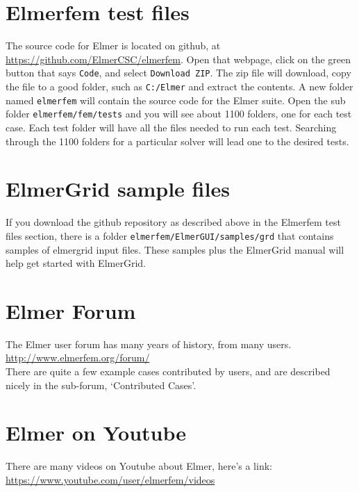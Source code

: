 \section{Elmerfem test files}

The source code for Elmer is located on github, at \url{https://github.com/ElmerCSC/elmerfem}.  Open that webpage, click on the green button that says \texttt{Code}, and select \texttt{Download ZIP}.  The zip file will download, copy the file to a good folder, such as \texttt{C:/Elmer} and extract the contents.  A new folder named \texttt{elmerfem} will contain the source code for the Elmer suite.  Open the sub folder \texttt{elmerfem/fem/tests} and you will see about 1100 folders, one for each test case.  Each test folder will have all the files needed to run each test.  Searching through the 1100 folders for a particular solver will lead one to the desired tests.

\section{ElmerGrid sample files}

If you download the github repository as described above in the Elmerfem test files section, there is a folder \texttt{elmerfem/ElmerGUI/samples/grd} that contains samples of elmergrid input files.  These samples plus the ElmerGrid manual will help get started with ElmerGrid.

\section{Elmer Forum}

The Elmer user forum has many years of history, from many users.\\

\url{http://www.elmerfem.org/forum/}\\

There are quite a few example cases contributed by users, and are described nicely in the sub-forum, `Contributed Cases'.

\section{Elmer on Youtube}

There are many videos on Youtube about Elmer, here's a link:\\

\url{https://www.youtube.com/user/elmerfem/videos}

